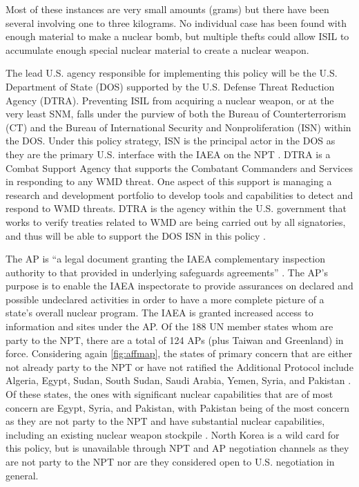 \documentclass{report}
\begin{document}
Most of these instances are very small amounts (grams) but there have been several involving one to three kilograms. No individual case has been found with enough material to make a nuclear bomb, but multiple thefts could allow ISIL to accumulate enough special nuclear material to create a nuclear weapon. 


The lead U.S. agency responsible for implementing this policy will be the U.S. Department of State (DOS) supported by the U.S. Defense Threat Reduction Agency (DTRA). Preventing ISIL from acquiring a nuclear weapon, or at the very least SNM, falls under the purview of both the Bureau of Counterterrorism (CT) and the Bureau of International Security and Nonproliferation (ISN) within the DOS. Under this policy strategy, ISN is the principal actor in the DOS as they are the primary U.S. interface with the IAEA on the NPT \cite{Circular1970}. DTRA is a Combat Support Agency that supports the Combatant Commanders and Services in responding to any WMD threat. One aspect of this support is managing a research and development portfolio to develop tools and capabilities to detect and respond to WMD threats. DTRA is the agency within the U.S. government that works to verify treaties related to WMD are being carried out by all signatories, and thus will be able to support the DOS ISN in this policy \cite{DefenseThreatReductionAgency}. 

The AP is \enquote{a legal document granting the IAEA complementary inspection authority to that provided in underlying safeguards agreements} \cite{InternationalAtomicEnergyAgency1997}. The AP's purpose is to enable the IAEA inspectorate to provide assurances on declared and possible undeclared activities in order to have a more complete picture of a state's overall nuclear program. The IAEA is granted increased access to information and sites under the AP. Of the 188 UN member states whom are party to the NPT, there are a total of 124 APs (plus Taiwan and Greenland) in force. Considering again \autoref{fig:affmap}, the states of primary concern that are either not already party to the NPT or have not ratified the Additional Protocol include Algeria, Egypt, Sudan, South Sudan, Saudi Arabia, Yemen, Syria, and Pakistan \cite{DefenseThreatReductionAgency,InventoryofInternationalNonproliferationOrganizationsandRegimes2013}. Of these states, the ones with significant nuclear capabilities that are of most concern are Egypt, Syria, and Pakistan, with Pakistan being of the most concern as they are not party to the NPT and have substantial nuclear capabilities, including an existing nuclear weapon stockpile \cite{InventoryofInternationalNonproliferationOrganizationsandRegimes2013}. North Korea is a wild card for this policy, but is unavailable through NPT and AP negotiation channels as they are not party to the NPT nor are they considered open to U.S. negotiation in general. 
\end{document}
